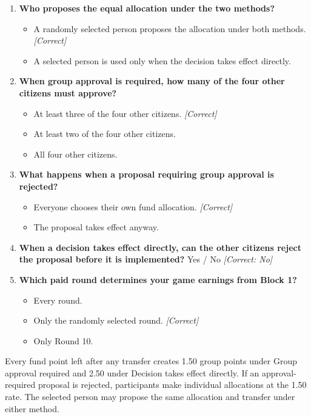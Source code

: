 \begin{enumerate}
  \item \textbf{Who proposes the equal allocation under the two methods?}
  \begin{itemize}
    \item A randomly selected person proposes the allocation under both methods. \emph{[Correct]}
    \item A selected person is used only when the decision takes effect directly.
  \end{itemize}
  \item \textbf{When group approval is required, how many of the four other citizens must approve?}
  \begin{itemize}
    \item At least three of the four other citizens. \emph{[Correct]}
    \item At least two of the four other citizens.
    \item All four other citizens.
  \end{itemize}
  \item \textbf{What happens when a proposal requiring group approval is rejected?}
  \begin{itemize}
    \item Everyone chooses their own fund allocation. \emph{[Correct]}
    \item The proposal takes effect anyway.
  \end{itemize}
  \item \textbf{When a decision takes effect directly, can the other citizens reject the proposal before it is implemented?} Yes / No \emph{[Correct: No]}
  \item \textbf{Which paid round determines your game earnings from Block 1?}
  \begin{itemize}
    \item Every round.
    \item Only the randomly selected round. \emph{[Correct]}
    \item Only Round 10.
  \end{itemize}
\end{enumerate}

Every fund point left after any transfer creates 1.50 group points under Group approval required and 2.50 under Decision takes effect directly. If an approval-required proposal is rejected, participants make individual allocations at the 1.50 rate. The selected person may propose the same allocation and transfer under either method.

